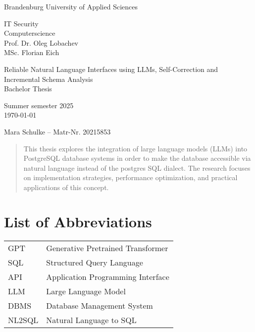 \documentclass{article}
\begin{document}
\begin{titlepage}
    \begin{center}
        \begin{Large}
            Brandenburg University of Applied Sciences \\[1em]
        \end{Large}
        IT Security \\
        Computerscience \\
        Prof. Dr. Oleg Lobachev \\
        MSc. Florian Eich
    \end{center}

    \vfill

    \begin{center}
        \Large{Reliable Natural Language Interfaces using LLMs, Self-Correction and Incremental Schema Analysis}\\[0.5em]
        \large{Bachelor Thesis}\\[1em]
        
        \begin{normalsize}
            Summer semester 2025\\[0.25em]
            \today
        \end{normalsize}
    \end{center}

    \vfill

    \begin{center}
        Mara Schulke – Matr-Nr. 20215853
    \end{center}
\end{titlepage}

\begin{abstract}
This thesis explores the integration of large language models (LLMs) into PostgreSQL database systems in order
to make the database accessible via natural language instead of the postgres SQL dialect. The research focuses
on implementation strategies, performance optimization, and practical applications of this concept.
\end{abstract}

\tableofcontents

\listoffigures

\section*{List of Abbreviations}
\begin{tabular}{ll}
GPT & Generative Pretrained Transformer \\
SQL & Structured Query Language \\
API & Application Programming Interface \\
LLM & Large Language Model \\
DBMS & Database Management System \\
NL2SQL & Natural Language to SQL \\
\end{tabular}
\end{document}
